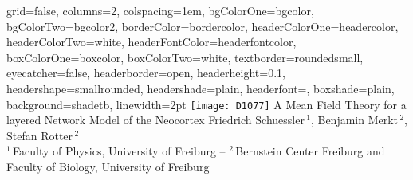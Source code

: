 \documentclass[portrait, final, a0paper, fontscale=0.34, leqno]{baposter}
\begin{document}
\newlength{\leftimgwidth}
\begin{poster}%
  {
  grid=false,
  columns=2,
  colspacing=1em,
  bgColorOne=bgcolor,
  bgColorTwo=bgcolor2,
  borderColor=bordercolor,
  headerColorOne=headercolor,
  headerColorTwo=white, %
  headerFontColor=headerfontcolor,
  boxColorOne=boxcolor,
  boxColorTwo=white,    %
  textborder=roundedsmall,
  eyecatcher=false,
  headerborder=open, 
  headerheight=0.1\textheight,
  headershape=smallrounded,
  headershade=plain,
  headerfont=\Large\textsf, %
  boxshade=plain,
  background=shadetb,
  linewidth=2pt
  }
  {\texttt{[image: D1077]}} %
  {\sf %
      A Mean Field Theory for a layered Network Model of the Neocortex
\vspace{0.3em}}
  {\sf %
      \vspace{0em}\Large{Friedrich Schuessler\,$^{1}$, Benjamin Merkt\,$^{2}$, Stefan Rotter\,$^{2}$\\
  \normalsize
  $^1$\,Faculty of Physics, University of Freiburg -- 
  $^2$\,Bernstein Center Freiburg and Faculty of Biology, University of Freiburg 
  }
  }
  {%
  }




\end{poster}
\end{document}
